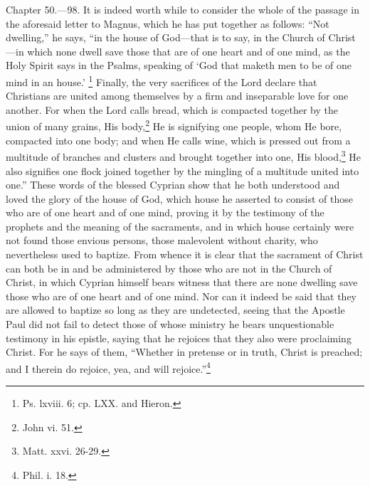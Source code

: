 
Chapter 50.—98. It is indeed worth while to consider the whole of the passage in the aforesaid letter to Magnus, which he has put together as follows: ``Not dwelling,'' he says, ``in the house of God—that is to say, in the Church of Christ—in which none dwell save those that are of one heart and of one mind, as the Holy Spirit says in the Psalms, speaking of ‘God that maketh men to be of one mind in an house.’ \footnote{\par  Ps. lxviii. 6; cp. LXX. and Hieron.} Finally, the very sacrifices of the Lord declare that Christians are united among themselves by a firm and inseparable love for one another. For when the Lord calls bread, which is compacted together by the union of many grains, His body,\footnote{\par  John vi. 51.} He is signifying one people, whom He bore, compacted into one body; and when He calls wine, which is pressed out from a multitude of branches and clusters and brought together into one, His blood,\footnote{\par  Matt. xxvi. 26-29.} He also signifies one flock joined together by the mingling of a multitude united into one.'' These words of the blessed Cyprian show that he both understood and loved the glory of the house of God, which house he asserted to consist of those who are of one heart and of one mind, proving it by the testimony of the prophets and the meaning of the sacraments, and in which house certainly were not found those envious persons, those malevolent without charity, who nevertheless used to baptize. From whence it is clear that the sacrament of Christ can both be in and be administered by those who are not in the Church of Christ, in which Cyprian himself bears witness that there are none dwelling save those who are of one heart and of one mind. Nor can it indeed be said that they are allowed to baptize so long as they are undetected, seeing that the Apostle Paul did not fail to detect those of whose ministry he bears unquestionable testimony in his epistle, saying that he rejoices that they also were proclaiming Christ. For he says of them, ``Whether in pretense or in truth, Christ is preached; and I therein do rejoice, yea, and will rejoice.''\footnote{\par  Phil. i. 18.}


